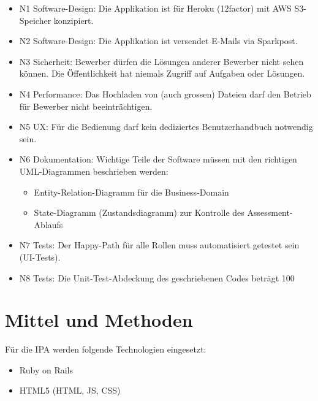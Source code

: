 \begin{itemize}
    \item N1 Software-Design: Die Applikation ist für Heroku (12factor) mit AWS S3-Speicher konzipiert.
    \item N2 Software-Design: Die Applikation ist versendet E-Mails via Sparkpost.
    \item N3 Sicherheit: Bewerber dürfen die Lösungen anderer Bewerber nicht sehen können. Die Öffentlichkeit hat niemals Zugriff auf Aufgaben oder Lösungen.
    \item N4 Performance: Das Hochladen von (auch grossen) Dateien darf den Betrieb für Bewerber nicht beeinträchtigen.
    \item N5 UX: Für die Bedienung darf kein dediziertes Benutzerhandbuch notwendig sein.
    \item N6 Dokumentation: Wichtige Teile der Software müssen mit den richtigen UML-Diagrammen beschrieben werden:
          \begin{itemize}
              \item Entity-Relation-Diagramm für die Business-Domain
              \item State-Diagramm (Zustandsdiagramm) zur Kontrolle des Assessment-Ablaufs
          \end{itemize}
    \item N7 Tests: Der Happy-Path für alle Rollen muss automatisiert getestet sein (UI-Tests).
    \item N8 Tests: Die Unit-Test-Abdeckung des geschriebenen Codes beträgt 100%
\end{itemize}

\section{Mittel und Methoden}

Für die IPA werden folgende Technologien eingesetzt:
\begin{itemize}
    \item Ruby on Rails
    \item HTML5 (HTML, JS, CSS)
\end{itemize}
